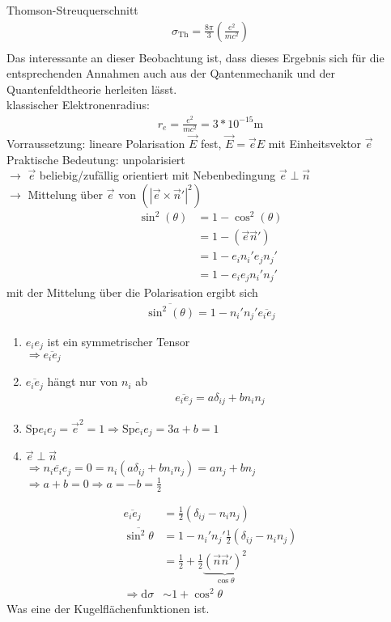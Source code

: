 \documentclass[a4paper]{article}
\begin{document}
Thomson-Streuquerschnitt
\begin{align}
\sigma_{\text{Th}}=\frac{8\pi}{3}\left( \frac{e^2}{mc^2} \right)\\
\end{align}
Das interessante an dieser Beobachtung ist, dass dieses Ergebnis sich für die
entsprechenden Annahmen auch aus der Qantenmechanik und der Quantenfeldtheorie
herleiten lässt.\\
klassischer Elektronenradius:\\
\begin{align}
r_e=\frac{e^2}{mc^2}=3*10^{-15}\mathrm{m}
\end{align}
Vorraussetzung: lineare Polarisation
$\vec{E}$ fest, $\vec{E}=\vec{e}E$ mit Einheitsvektor $\vec{e}$\\
Praktische Bedeutung: unpolarisiert\\
$\longrightarrow$ $\vec{e}$ beliebig/zufällig orientiert mit Nebenbedingung
$\vec{e}\perp\vec{n}$\\
$\longrightarrow$ Mittelung über $\vec{e}$ von $\left( |\vec{e}\times\vec{n}'|^2
\right)$
\begin{align}
\sin^2(\theta)&=1-\cos^2(\theta)\\
&=1-(\vec{e}\vec{n}')\\
&=1-e_i {n_i}'e_j {n_j}'\\
&=1-e_ie_j {n_i}'{n_j}'
\end{align}
mit der Mittelung über die Polarisation ergibt sich
\begin{align}
\overline{\sin^2(\theta)}=1-{n_i}'{n_j}' \overline{e_ie_j}
\end{align}
\begin{enumerate}
  \item $e_ie_j$ ist ein symmetrischer Tensor \\ $\Rightarrow\overline{e_ie_j}$
  \item $\overline{e_ie_j}$ hängt nur von $n_i$ ab
 	\begin{align}
		\overline{e_ie_j}=a\delta_{ij}+bn_in_j
	\end{align}
 \item $\mathrm{Sp}e_ie_j=\vec{e}^2=1
 \Rightarrow\overline{\mathrm{Sp}e_ie_j}=3a+b=1$
 \item $\vec{e}\perp\vec{n}$\\ $\Rightarrow \overline{n_ie_ie_j}=0
 =n_i(a\delta_{ij}+bn_in_j)=an_j+bn_j$ \\ $\Rightarrow a+b=0 \Rightarrow
 a=-b=\frac{1}{2}$
\end{enumerate}
\begin{align}
\overline{e_ie_j}&=\frac{1}{2}\left(\delta_{ij}-n_in_j \right)\\
\overline{\sin^2\theta}&=1-{n_i}'{n_j}'\frac{1}{2}\left(\delta_{ij}-n_in_j
\right)\\
&=\frac{1}{2}+\frac{1}{2}\underbrace{\left( \vec{n}\vec{n}'
\right)^2}_{\cos\theta}\\
\Rightarrow \mathrm{d}\sigma&\sim1+\cos^2\theta
\end{align}
Was eine der Kugelflächenfunktionen ist.
\end{document}
